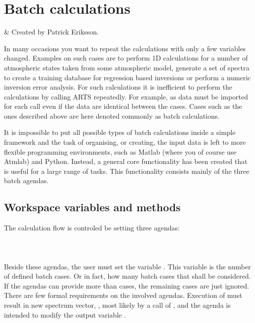 \chapter{Batch calculations}
 \label{sec:batch}


%
%
 & Created by Patrick Eriksson.\\
\stophistory

In many occasions you want to repeat the calculations with only a few
variables changed. Examples on such cases are to perform 1D
calculations for a number of atmospheric states taken from some
atmospheric model, generate a set of spectra to create a training
database for regression based inversions or perform a numeric
inversion error analysis. For such calculations it is inefficient to
perform the calculations by calling ARTS repeatedly. For example, as
data must be imported for each call even if the data are identical
between the cases. Cases such as the ones described above are here
denoted commonly as batch calculations.

It is impossible to put all possible types of batch calculations
inside a simple framework and the task of organising, or creating, the
input data is left to more flexible programming environments, such as
Matlab (where you of course use Atmlab) and Python. Instead, a general
core functionality has been created that is useful for a large range
of tasks. This functionality consists mainly of the three batch
agendas.


\section{Workspace variables and methods}
%
The calculation flow is controled be setting three agendas:\\
\indent {} \\
\indent {} \\
\indent {} \\
Beside these agendas, the user must set the variable
. This variable is the number of defined batch
cases. Or in fact, how many batch cases that shall be considered. If
the agendas can provide more than  cases, the
remaining cases are just ignored. There are few formal requirements on
the involved agendas. Execution of 
must result in new spectrum vector, , most likely by a
call of , and the agenda
 is intended to modify the output
variable .

